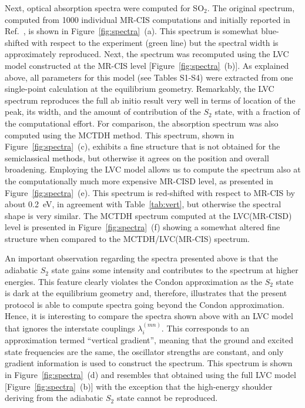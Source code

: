 \documentclass[twoside,twocolumn,9pt]{article}
\begin{document}
Next, optical absorption spectra were computed for SO$_2$.
The original spectrum, computed from 1000 individual MR-CIS computations and initially reported in Ref.~, is shown in Figure~\ref{fig:spectra}~(a).
This spectrum is somewhat blue-shifted with respect to the experiment\cite{Golomb1962} (green line) but the spectral width is approximately reproduced.
Next, the spectrum was recomputed using the LVC model constructed at the MR-CIS level [Figure~\ref{fig:spectra}~(b)].
As explained above, all parameters for this model (see Tables S1-S4) were extracted from one single-point calculation at the equilibrium geometry.
Remarkably, the LVC spectrum reproduces the full ab initio result very well in terms of location of the peak, its width, and the amount of contribution of the $S_2$ state, with a fraction of the computational effort.
For comparison, the absorption spectrum was also computed using the MCTDH method.
This spectrum, shown in Figure~\ref{fig:spectra}~(c), exhibits a fine structure that is not obtained for the semiclassical methods, but otherwise it agrees on the position and overall broadening.
Employing the LVC model allows us to compute the spectrum also at the computationally much more expensive MR-CISD level, as presented in Figure~\ref{fig:spectra}~(e).
This spectrum is red-shifted with respect to MR-CIS by about 0.2~eV, in agreement with Table~\ref{tab:vert}, but otherwise the spectral shape is very similar.
The MCTDH spectrum computed at the LVC(MR-CISD) level is presented in Figure~\ref{fig:spectra}~(f) showing a somewhat altered fine structure when compared to the MCTDH/LVC(MR-CIS) spectrum.

An important observation regarding the spectra presented above is that the adiabatic $S_2$ state gains some intensity and contributes to the spectrum at higher energies.
This feature clearly violates the Condon approximation as the $S_2$ state is dark at the equilibrium geometry and, therefore, illustrates that the present protocol is able to compute spectra going beyond the Condon approximation.
Hence, it is interesting to compare the spectra shown above with an LVC model that ignores the interstate couplings $\lambda_i^{(mn)}$.
This corresponds to an approximation termed ``vertical gradient'',\cite{Bloino2010} meaning that the ground and excited state frequencies are the same, the oscillator strengths are constant, and only gradient information is used to construct the spectrum.
This spectrum is shown in Figure~\ref{fig:spectra}~(d) and resembles that obtained using the full LVC model [Figure~\ref{fig:spectra}~(b)] with the exception that the high-energy shoulder deriving from the adiabatic $S_2$ state cannot be reproduced.
\end{document}
